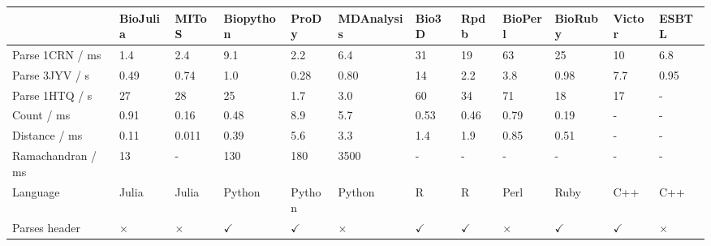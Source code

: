 \begin{table}
\centering

\begin{footnotesize}
\begin{tabular}{ l p{1.2cm} p{1.2cm} p{1.5cm} p{1.2cm} p{1.7cm} p{1.2cm} p{1.2cm} p{1.2cm} p{1.2cm} p{1.2cm} p{1.2cm} }
\hline
                      & \textbf{BioJulia} & \textbf{MIToS} & \textbf{Biopython} & \textbf{ProDy} & \textbf{MDAnalysis} & \textbf{Bio3D} & \textbf{Rpdb} & \textbf{BioPerl}      & \textbf{BioRuby} & \textbf{Victor} & \textbf{ESBTL} \\
\hline
Parse 1CRN / ms       & 1.4               & 2.4            & 9.1                & 2.2            & 6.4                 & 31             & 19            & 63                    & 25               & 10              & 6.8            \\
Parse 3JYV / s        & 0.49              & 0.74           & 1.0                & 0.28           & 0.80                & 14             & 2.2           & 3.8                   & 0.98             & 7.7             & 0.95           \\
Parse 1HTQ / s        & 27                & 28             & 25                 & 1.7            & 3.0                 & 60             & 34            & 71                    & 18               & 17              & -              \\
Count / ms            & 0.91              & 0.16           & 0.48               & 8.9            & 5.7                 & 0.53           & 0.46          & 0.79                  & 0.19             & -               & -              \\
Distance / ms         & 0.11              & 0.011          & 0.39               & 5.6            & 3.3                 & 1.4            & 1.9           & 0.85                  & 0.51             & -               & -              \\
Ramachandran / ms     & 13                & -              & 130                & 180            & 3500                & -              & -             & -                     & -                & -               & -              \\
Language              & Julia             & Julia          & Python             & Python         & Python              & R              & R             & Perl                  & Ruby             & C++             & C++            \\
Parses header         & $\times$          & $\times$       & $\checkmark$       & $\checkmark$   & $\times$            & $\checkmark$   & $\checkmark$  & $\times$              & $\checkmark$     & $\checkmark$    & $\times$       \\

\end{tabular}
\end{footnotesize}
\end{table}
